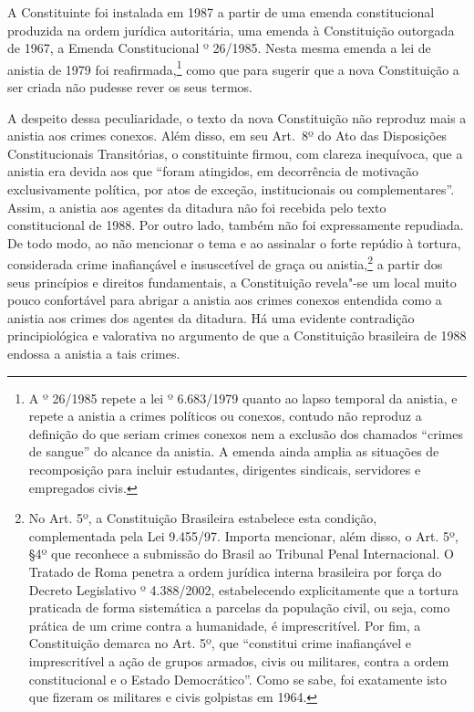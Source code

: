 A Constituinte foi instalada em 1987 a partir de uma emenda
constitucional produzida na ordem jurídica autoritária, uma emenda à
Constituição outorgada de 1967, a Emenda Constitucional º 26/1985.
Nesta mesma emenda a lei de anistia de 1979 foi reafirmada,\footnote{A 
  º 26/1985 repete a lei º 6.683/1979 quanto ao lapso temporal da
  anistia, e repete a anistia a crimes políticos ou conexos, contudo não
  reproduz a definição do que seriam crimes conexos nem a exclusão dos
  chamados ``crimes de sangue'' do alcance da anistia. A emenda ainda
  amplia as situações de recomposição para incluir estudantes,
  dirigentes sindicais, servidores e empregados civis.} como que para
sugerir que a nova Constituição a ser criada não pudesse rever os seus
termos.

A despeito dessa peculiaridade, o texto da nova Constituição não
reproduz mais a anistia aos crimes conexos. Além disso, em seu Art.~8º
do Ato das Disposições Constitucionais Transitórias, o constituinte
firmou, com clareza inequívoca, que a anistia era devida aos que ``foram
atingidos, em decorrência de motivação exclusivamente política, por atos
de exceção, institucionais ou complementares''. Assim, a anistia aos
agentes da ditadura não foi recebida pelo texto constitucional de 1988.
Por outro lado, também não foi expressamente repudiada. De todo modo, ao
não mencionar o tema e ao assinalar o forte repúdio à tortura,
considerada crime inafiançável e insuscetível de graça ou
anistia,\footnote{No Art. 5º,  a Constituição Brasileira estabelece
  esta condição, complementada pela Lei 9.455/97. Importa mencionar,
  além disso, o Art. 5º, §4º que reconhece a submissão do Brasil ao
  Tribunal Penal Internacional. O Tratado de Roma penetra a ordem
  jurídica interna brasileira por força do Decreto Legislativo º
  4.388/2002, estabelecendo explicitamente que a tortura praticada de
  forma sistemática a parcelas da população civil, ou seja, como prática
  de um crime contra a humanidade, é imprescritível. Por fim, a
  Constituição demarca no Art. 5º,  que ``constitui crime
      inafiançável e imprescritível a ação de grupos armados, civis ou
      militares, contra a ordem constitucional e o Estado Democrático''. Como
  se sabe, foi exatamente isto que fizeram os militares e civis
  golpistas em 1964.} a partir dos seus princípios e direitos
fundamentais, a Constituição revela"-se um local muito pouco confortável
para abrigar a anistia aos crimes conexos entendida como a anistia aos
crimes dos agentes da ditadura. Há uma evidente contradição
principiológica e valorativa no argumento de que a Constituição
brasileira de 1988 endossa a anistia a tais crimes.


